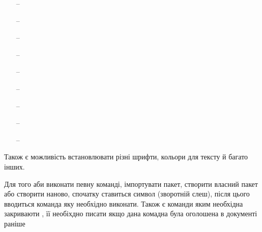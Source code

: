 {\begin{itemize}[itemsep=0cm,labelsep=-1cm,parsep=0pt,topsep=0pt,partopsep=0pt,leftmargin=0pt]
  \item[--] \hspace{1.25cm}{звичайний текст;}
  \item[--] 
  \item[--] 
  \item[--] 
  \item[--] \hspace{1.25cm}{розташування тексту ліворуч;}
  \item[--] 
  \item[--] \hspace{1.25cm}{відступи;}
  \item[--] 
  \item[--] \hspace{1.25cm}{заголовки.}
\end{itemize} \par

Також є можливість встановлювати різні шрифти, кольори для тексту й багато інших. \par

Для того аби виконати певну команді, імпортувати пакет, створити власний пакет або
створити наново, спочатку ставиться символ \quotesA{ \textbackslash{} } (зворотній слеш),
після цього вводиться команда яку необхідно виконати.
Також є команди яким необхідна закриваюти ,
її необіхдно писати якщо дана комадна була оголошена в документі раніше  \par
% 
}
